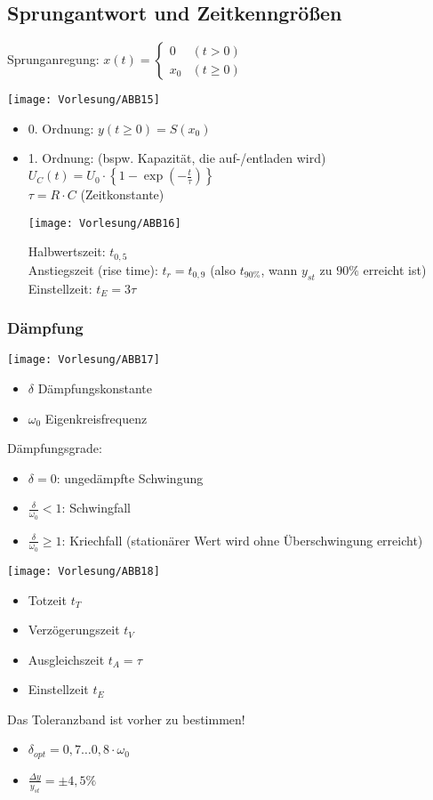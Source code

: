 \documentclass{scrreprt}
\begin{document}
\subsection{Sprungantwort und Zeitkenngrößen}
Sprunganregung: $x(t) =\begin{cases}
0 &(t>0)\\
x_0 & (t \geq 0)
\end{cases}$
\begin{center}
\texttt{[image: Vorlesung/ABB15]}
\end{center}
\begin{itemize}
\item 0. Ordnung: $y(t\geq 0) = S(x_0)$
\item 1. Ordnung: (bspw. Kapazität, die auf-/entladen wird) $U_C(t) = U_0 \cdot \left\lbrace 1- \exp \left(-\frac{t}{\tau}\right)\right\rbrace$\\
$\tau = R \cdot C$ (Zeitkonstante)
\begin{center}
\texttt{[image: Vorlesung/ABB16]}
\end{center}
Halbwertszeit: $t_{0,5}$\\
Anstiegszeit (rise time): $t_r = t_{0,9}$ (also $t_{90\%}$, wann $y_{st}$ zu $90\%$ erreicht ist)\\
Einstellzeit: $t_E = 3 \tau$
\end{itemize}
\subsubsection{Dämpfung}
\begin{center}
\texttt{[image: Vorlesung/ABB17]}
\end{center}
\begin{itemize}
\item $\delta$ Dämpfungskonstante
\item $\omega_0$ Eigenkreisfrequenz
\end{itemize}
Dämpfungsgrade:
\begin{itemize}
\item $\delta = 0$: ungedämpfte Schwingung%
\item $\frac{\delta}{\omega_0}<1$: Schwingfall
\item $\frac{\delta}{\omega_0}\geq 1$: Kriechfall (stationärer Wert wird ohne Überschwingung erreicht)
\end{itemize}
\begin{center}
\texttt{[image: Vorlesung/ABB18]}
\end{center}
\begin{itemize}
\item Totzeit $t_T$
\item Verzögerungszeit $t_V$
\item Ausgleichszeit $t_A = \tau$
\item Einstellzeit $t_E$ 
\end{itemize}
Das Toleranzband ist vorher zu bestimmen!
\begin{itemize}
\item $\delta_{opt}=0,7 \dots 0,8 \cdot \omega_0$
\item $\frac{\Delta y}{y_{st}}=\pm 4,5 \%$
\end{itemize}
\end{document}
